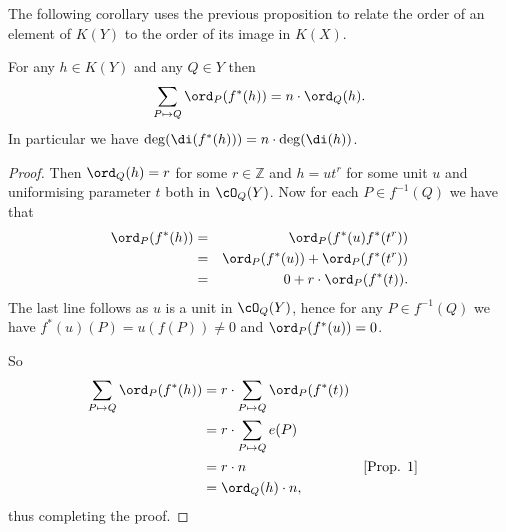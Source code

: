 The following corollary uses the previous proposition to relate the order of an element of $K(Y)$ to the order of its image in $K(X)$. \\


\begin{cor}
	For any $h\in K(Y)$ and any $Q\in Y$ then
		\begin{equation*}
			\sum_{P\mapsto Q} \ord_{P} (f^*(h))=n\cdot \ord_{Q}(h).
		\end{equation*}
	In particular we have $\deg( \di(f^*(h)))=n\cdot \deg( \di (h))$.
\end{cor}
\begin{proof}
	Then $\ord_{Q}(h)=r$ for some $r\in \mathbb Z$ and $h=ut^{r}$ for some unit $u$ and uniformising parameter $t$ both in $\cO_{Q}(Y)$. 
	Now for each $P\in f^{-1}(Q)$ we have that 
		\begin{eqnarray*}
			\ord_{P}(f^*(h)) & = & \ord_{P}(f^*(u)f^*(t^{r})) \\
			&  = & \ord_{P}(f^*(u))+\ord_{P}(f^*(t^{r})) \\
			& = &  0 + r\cdot \ord_{P}(f^*(t)).  \\
		\end{eqnarray*}
	The last line follows as $u$ is a unit in $\cO_Q(Y)$, hence for any $P\in f^{-1}(Q)$ we have $f^*(u)(P)=u(f(P))\neq 0$ and $\ord_P(f^*(u))=0$.

	So
		\begin{align*}
			\sum_{P\mapsto Q}\ord_{P}(f^*(h)) & =  r\cdot \sum_{P\mapsto Q} \ord_{P}(f^*(t)) \\
			& = r\cdot \sum_{P\mapsto Q} e(P) \\
			& = r\cdot n && \mbox{[Prop. 1]} \\
			& = \ord_{Q}(h)\cdot n, \\
		\end{align*}
	thus completing the proof.
\end{proof}


